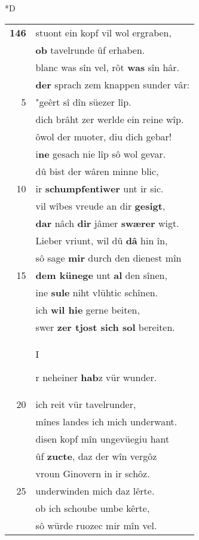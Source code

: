 \documentclass[8pt,a4paper,notitlepage]{article}
\begin{document}
\begin{table}[ht]
\begin{minipage}[t]{0.5\linewidth}
\small
\begin{center}*D
\end{center}
\begin{tabular}{rl}
\textbf{146} & stuont ein kopf vil wol ergraben,\\ 
 & \textbf{ob} tavelrunde ûf erhaben.\\ 
 & blanc was sîn vel, rôt \textbf{was} sîn hâr.\\ 
 & \textbf{der} sprach zem knappen sunder vâr:\\ 
5 & "geêrt sî dîn süezer lîp.\\ 
 & dich brâht zer werlde ein reine wîp.\\ 
 & ôwol der muoter, diu dich gebar!\\ 
 & i\textbf{ne} gesach nie lîp sô wol gevar.\\ 
 & dû bist der wâren minne blic,\\ 
10 & ir \textbf{schumpfentiwer} unt ir sic.\\ 
 & vil wîbes vreude an dir \textbf{gesigt},\\ 
 & \textbf{dar} nâch \textbf{dir} jâmer \textbf{swærer} wigt.\\ 
 & Lieber vriunt, wil dû \textbf{dâ} hin în,\\ 
 & sô sage \textbf{mir} durch den dienest mîn\\ 
15 & \textbf{dem künege} unt \textbf{al} den sînen,\\ 
 & ine \textbf{sule} niht vlühtic schînen.\\ 
 & ich \textbf{wil hie} gerne beiten,\\ 
 & swer \textbf{zer tjost sich sol} bereiten.\\ 
 & \begin{large}I\end{large}r neheiner \textbf{hab}z vür wunder.\\ 
20 & ich reit vür tavelrunder,\\ 
 & mînes landes ich mich underwant.\\ 
 & disen kopf mîn ungevüegiu hant\\ 
 & ûf \textbf{zucte}, daz der wîn vergôz\\ 
 & vroun Ginovern in ir schôz.\\ 
25 & underwinden mich daz lêrte.\\ 
 & ob ich schoube umbe kêrte,\\ 
 & sô würde ruozec mir mîn vel.\\ 

\end{tabular}
\end{minipage}
\end{table}
\end{document}
